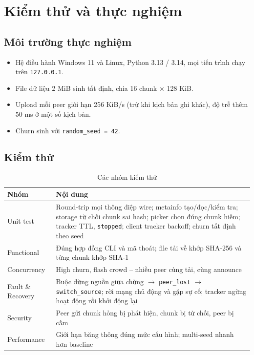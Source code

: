 \documentclass[12pt,a4paper,oneside]{report}
\begin{document}
\chapter{Kiểm thử và thực nghiệm}

\section{Môi trường thực nghiệm}
\begin{itemize}
  \item Hệ điều hành Windows 11 và Linux, Python 3.13 / 3.14, mọi tiến trình chạy trên \texttt{127.0.0.1}.
  \item File dữ liệu 2 MiB sinh tất định, chia 16 chunk $\times$ 128 KiB.
  \item Upload mỗi peer giới hạn 256 KiB/s (trừ khi kịch bản ghi khác), độ trễ thêm 50 ms ở một số kịch bản.
  \item Churn sinh với \texttt{random\_seed = 42}.
\end{itemize}

\section{Kiểm thử}

\begin{table}[H]
\centering
\caption{Các nhóm kiểm thử}
\begin{tabularx}{\textwidth}{@{}p{3.4cm}L@{}}
\toprule
\textbf{Nhóm} & \textbf{Nội dung}\\\midrule
Unit test & Round-trip mọi thông điệp wire; metainfo tạo/đọc/kiểm tra; storage từ chối chunk sai hash; picker chọn đúng chunk hiếm; tracker TTL, \texttt{stopped}; client tracker backoff; churn tất định theo seed\\
Functional & Đúng hợp đồng CLI và mã thoát; file tải về khớp SHA-256 và từng chunk khớp SHA-1\\
Concurrency & High churn, flash crowd -- nhiều peer cùng tải, cùng announce\\
Fault \& Recovery & Buộc dừng nguồn giữa chừng $\rightarrow$ \texttt{peer\_lost} $\rightarrow$ \texttt{switch\_source}; rời mạng chủ động và gặp sự cố; tracker ngừng hoạt động rồi khởi động lại\\
Security & Peer gửi chunk hỏng bị phát hiện, chunk bị từ chối, peer bị cấm\\
Performance & Giới hạn băng thông đúng mức cấu hình; multi-seed nhanh hơn baseline\\
\bottomrule
\end{tabularx}
\end{table}
\end{document}
